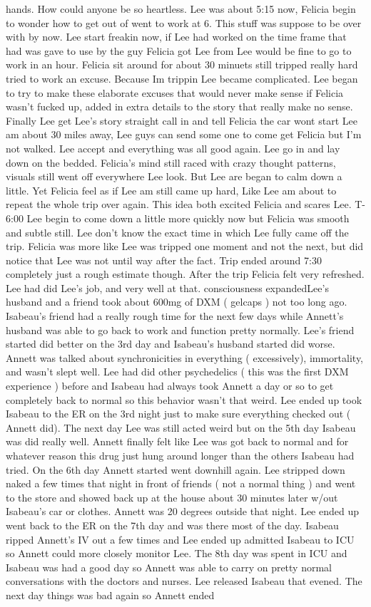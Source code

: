 \documentclass[12pt]{book}
\begin{document}
hands. How could anyone be so heartless. Lee was about 5:15 now, Felicia begin to wonder how to get out of went to work at 6. This stuff was suppose to be over with by now. Lee start freakin now, if Lee had worked on the time frame that had was gave to use by the guy Felicia got Lee from Lee would be fine to go to work in an hour. Felicia sit around for about 30 minuets still tripped really hard tried to work an excuse. Because Im trippin Lee became complicated. Lee began to try to make these elaborate excuses that would never make sense if Felicia wasn't fucked up, added in extra details to the story that really make no sense. Finally Lee get Lee's story straight call in and tell Felicia the car wont start Lee am about 30 miles away, Lee guys can send some one to come get Felicia but I'm not walked. Lee accept and everything was all good again. Lee go in and lay down on the bedded. Felicia's mind still raced with crazy thought patterns, visuals still went off everywhere Lee look. But Lee are began to calm down a little. Yet Felicia feel as if Lee am still came up hard, Like Lee am about to repeat the whole trip over again. This idea both excited Felicia and scares Lee. T-6:00 Lee begin to come down a little more quickly now but Felicia was smooth and subtle still. Lee don't know the exact time in which Lee fully came off the trip. Felicia was more like Lee was tripped one moment and not the next, but did notice that Lee was not until way after the fact. Trip ended around 7:30 completely just a rough estimate though. After the trip Felicia felt very refreshed. Lee had did Lee's job, and very well at that. consciousness expandedLee's husband and a friend took about 600mg of DXM ( gelcaps ) not too long ago. Isabeau's friend had a really rough time for the next few days while Annett's husband was able to go back to work and function pretty normally. Lee's friend started did better on the 3rd day and Isabeau's husband started did worse. Annett was talked about synchronicities in everything ( excessively), immortality, and wasn't slept well. Lee had did other psychedelics ( this was the first DXM experience ) before and Isabeau had always took Annett a day or so to get completely back to normal so this behavior wasn't that weird. Lee ended up took Isabeau to the ER on the 3rd night just to make sure everything checked out ( Annett did). The next day Lee was still acted weird but on the 5th day Isabeau was did really well. Annett finally felt like Lee was got back to normal and for whatever reason this drug just hung around longer than the others Isabeau had tried. On the 6th day Annett started went downhill again. Lee stripped down naked a few times that night in front of friends ( not a normal thing ) and went to the store and showed back up at the house about 30 minutes later w/out Isabeau's car or clothes. Annett was 20 degrees outside that night. Lee ended up went back to the ER on the 7th day and was there most of the day. Isabeau ripped Annett's IV out a few times and Lee ended up admitted Isabeau to ICU so Annett could more closely monitor Lee. The 8th day was spent in ICU and Isabeau was had a good day so Annett was able to carry on pretty normal conversations with the doctors and nurses. Lee released Isabeau that evened. The next day things was bad again so Annett ended 
\end{document}
